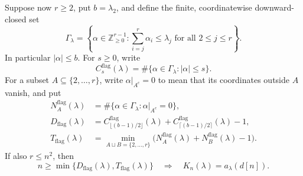 Suppose now \(r\geq2\), put \(b=\lambda_2\), and define
the finite, coordinatewise downward-closed set
\[
 \Gamma_\lambda=
 \left\{\alpha\in\mathbb Z_{\geq0}^{r-1}:
          \sum_{i=j}^r\alpha_i\leq\lambda_j
                              \text{ for all }2\leq j\leq r\right\}.
\]
In particular \(|\alpha|\leq b\). For \(s\geq0\), write
\[
 C_s^{\mathrm{flag}}(\lambda)=
       \#\{\alpha\in\Gamma_\lambda:|\alpha|\leq s\}.
\]
For a subset \(A\subseteq\{2,\ldots,r\}\), write
\(\alpha|_{A^c}=0\) to mean that its coordinates outside
\(A\) vanish, and put
\[
 \begin{split}
 N_A^{\mathrm{flag}}(\lambda)&=
       \#\{\alpha\in\Gamma_\lambda:\alpha|_{A^c}=0\},\\
 D_{\mathrm{flag}}(\lambda)&=
 C_{\lfloor(b-1)/2\rfloor}^{\mathrm{flag}}(\lambda)
 +C_{\lceil(b-1)/2\rceil}^{\mathrm{flag}}(\lambda)-1,\\
 T_{\mathrm{flag}}(\lambda)&=
 \min_{A\sqcup B=\{2,\ldots,r\}}
       \bigl(N_A^{\mathrm{flag}}(\lambda)
                         +N_B^{\mathrm{flag}}(\lambda)-1\bigr).
 \end{split}
\]
If also \(r\leq n^2\), then
\begin{equation}\label{eq:F016K}
 n\geq\min\{D_{\mathrm{flag}}(\lambda),T_{\mathrm{flag}}(\lambda)\}
 \quad\Longrightarrow\quad
                     K_n(\lambda)=a_\lambda(d[n]).
\end{equation}

